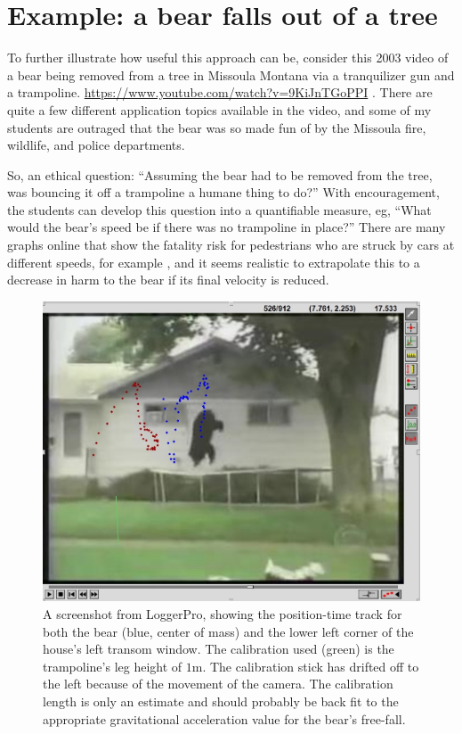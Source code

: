 \documentclass[prb,twocolumn]{revtex4-2}
\begin{document}
\clearpage

\section{Example: a bear falls out of a tree}
To further illustrate how useful this approach can be, consider this 2003 video of a bear being removed from a tree in Missoula Montana via a tranquilizer gun and a trampoline. \url{https://www.youtube.com/watch?v=9KiJnTGoPPI} \cite{bear_video_source}.  
There are quite a few different application topics available in the video, and some of my students are outraged that the bear was so made fun of by the Missoula fire, wildlife, and police departments.  

So, an ethical question: ``Assuming the bear had to be removed from the tree, was bouncing it off a trampoline a humane thing to do?''  With encouragement, the students can develop this question into a quantifiable measure, eg, ``What would the bear's speed be if there was no trampoline in place?''  There are many graphs online that show the fatality risk for pedestrians who are struck by cars at different speeds, for example \cite{AccidentRisk}, and it seems realistic to extrapolate this to a decrease in harm to the bear if its final velocity is reduced.

\begin{figure}[h]
\centering
\includegraphics[width=\columnwidth]{bear-dots.jpg}
\caption{
A screenshot from LoggerPro, showing the position-time track for both the bear (blue, center of mass) and the lower left corner of the house's left transom window. The calibration used (green) is the trampoline's leg height of $1$m.  The calibration stick has drifted off to the left because of the movement of the camera.  The calibration length is only an estimate and should probably be back fit to the appropriate gravitational acceleration value for the bear's free-fall.
}
\label{bear-dots}
\end{figure}
\end{document}
